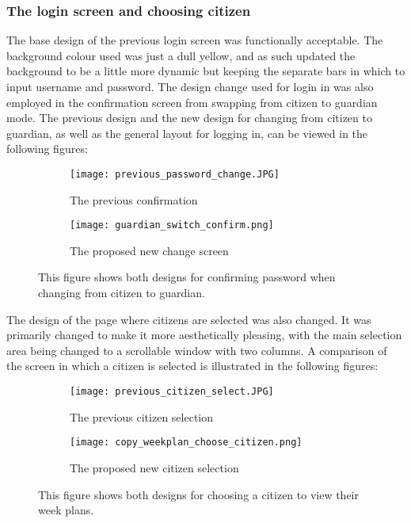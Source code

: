 \subsubsection{The login screen and choosing citizen}
The base design of the previous login screen was functionally acceptable. 
The background colour used was just a dull yellow, and as such updated the background to be a little more dynamic but keeping the separate bars in which to input username and password.
The design change used for login in was also employed in the confirmation screen from swapping from citizen to guardian mode. 
The previous design and the new design for changing from citizen to guardian, as well as the general layout for logging in, can be viewed in the following figures:
\begin{figure}[H]
    \begin{subfigure}{0.5\textwidth}
    \texttt{[image: previous\_password\_change.JPG]} 
    \caption{The previous confirmation}
    \label{fig:previous_guardian_confirm}
    \end{subfigure}
    \begin{subfigure}{0.5\textwidth}
        \texttt{[image: guardian\_switch\_confirm.png]}
    \caption{The proposed new change screen}
    \label{fig:new_guardian_confirm}
    \end{subfigure} 
    \caption{This figure shows both designs for confirming password when changing from citizen to guardian.}
    \label{fig:guardian_confirm}
\end{figure}
\noindent
The design of the page where citizens are selected was also changed.
It was  primarily changed to make it more aesthetically pleasing, with the main selection area being changed to a scrollable window with two columns. 
A comparison of the screen in which a citizen is selected is illustrated in the following figures:
\begin{figure}[H]
    \begin{subfigure}{0.5\textwidth}
    \texttt{[image: previous\_citizen\_select.JPG]} 
    \caption{The previous citizen selection}
    \label{fig:previous_guardian_confirm}
    \end{subfigure}
    \begin{subfigure}{0.5\textwidth}
        \texttt{[image: copy\_weekplan\_choose\_citizen.png]}
    \caption{The proposed new citizen selection}
    \label{fig:new_guardian_confirm}
    \end{subfigure} 
    \caption{This figure shows both designs for choosing a citizen to view their week plans.}
    \label{fig:guardian_confirm}
\end{figure}
\noindent

